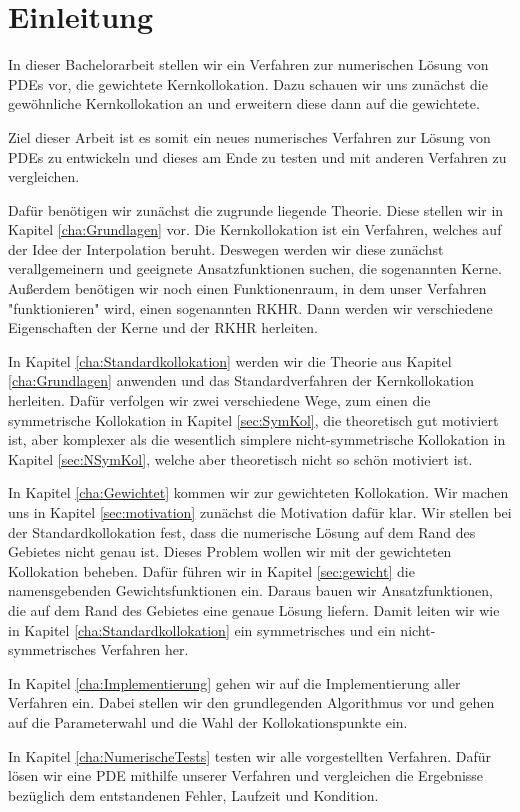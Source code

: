 \chapter{Einleitung}
\label{cha:Einleitung}
In dieser Bachelorarbeit stellen wir ein Verfahren zur numerischen Lösung von \acp{PDE} vor, die gewichtete Kernkollokation. Dazu schauen wir uns zunächst die gewöhnliche Kernkollokation an und erweitern diese dann auf die gewichtete.

Ziel dieser Arbeit ist es somit ein neues numerisches Verfahren zur Lösung von \acp{PDE} zu entwickeln und dieses am Ende zu testen und mit anderen Verfahren zu vergleichen.

Dafür benötigen wir zunächst die zugrunde liegende Theorie. Diese stellen wir in Kapitel \ref{cha:Grundlagen} vor. Die Kernkollokation ist ein Verfahren, welches auf der Idee der Interpolation beruht. Deswegen werden wir diese zunächst verallgemeinern und geeignete Ansatzfunktionen suchen, die sogenannten Kerne. Außerdem benötigen wir noch einen Funktionenraum, in dem unser Verfahren "funktionieren" wird, einen sogenannten \ac{RKHR}. Dann werden wir verschiedene Eigenschaften der Kerne und der \ac{RKHR} herleiten.

In Kapitel \ref{cha:Standardkollokation} werden wir die Theorie aus Kapitel \ref{cha:Grundlagen} anwenden und das Standardverfahren der Kernkollokation herleiten. Dafür verfolgen wir zwei verschiedene Wege, zum einen die symmetrische Kollokation in Kapitel \ref{sec:SymKol}, die theoretisch gut motiviert ist, aber komplexer als die wesentlich simplere nicht-symmetrische Kollokation in Kapitel \ref{sec:NSymKol}, welche aber theoretisch nicht so schön motiviert ist.

In Kapitel \ref{cha:Gewichtet} kommen wir zur gewichteten Kollokation. Wir machen uns in Kapitel \ref{sec:motivation} zunächst die Motivation dafür klar. Wir stellen bei der Standardkollokation fest, dass die numerische Lösung auf dem Rand des Gebietes nicht genau ist. Dieses Problem wollen wir mit der gewichteten Kollokation beheben. Dafür führen wir in Kapitel \ref{sec:gewicht} die namensgebenden Gewichtsfunktionen ein. Daraus bauen wir Ansatzfunktionen, die auf dem Rand des Gebietes eine genaue Lösung liefern. Damit leiten wir wie in Kapitel \ref{cha:Standardkollokation} ein symmetrisches und ein nicht-symmetrisches Verfahren her.

In Kapitel \ref{cha:Implementierung} gehen wir auf die Implementierung aller Verfahren ein. Dabei stellen wir den grundlegenden Algorithmus vor und gehen auf die Parameterwahl und die Wahl der Kollokationspunkte ein.

In Kapitel \ref{cha:NumerischeTests} testen wir alle vorgestellten Verfahren. Dafür lösen wir eine \ac{PDE} mithilfe unserer Verfahren und vergleichen die Ergebnisse bezüglich dem entstandenen Fehler, Laufzeit und Kondition.